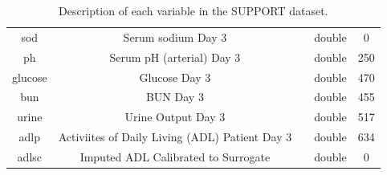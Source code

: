\documentclass[
]{jss}
\begin{document}
\begin{table}[ht]
\begin{tabular}{ccccc}
sod           & Serum sodium Day 3                       &                 & double           & 0            \\
ph            & Serum pH (arterial) Day 3                &                 & double           & 250          \\
glucose       & Glucose Day 3                            &                 & double           & 470          \\
bun           & BUN Day 3                                &                 & double           & 455          \\
urine         & Urine Output Day 3                       &                 & double           & 517          \\
adlp          & Activiites of Daily Living (ADL) Patient Day 3 &           & double           & 634          \\
adlsc         & Imputed ADL Calibrated to Surrogate      &                 & double           & 0           
\end{tabular}
\caption{Description of each variable in the SUPPORT dataset.}
\label{tab:support1}
\end{table}
\end{document}
